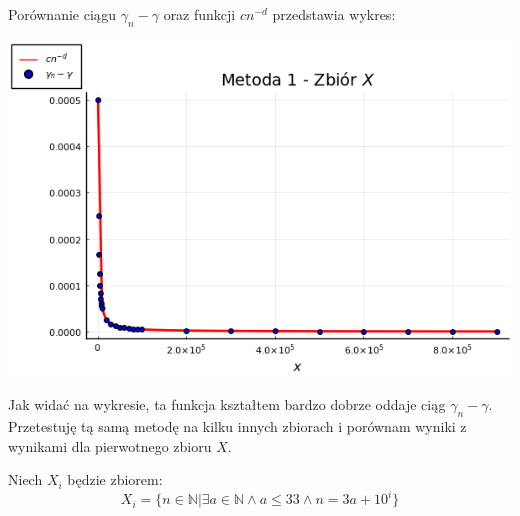 \documentclass[11pt,wide]{mwart}
\begin{document}
\begin{samepage}
Porównanie ciągu $\gamma_n - \gamma$ oraz funkcji $cn^{-d}$ przedstawia wykres:

\vspace{1cm}
\centerline{\includegraphics[scale=0.8]{chart1_1}}
\vspace{1cm}

\end{samepage}

Jak widać na wykresie, ta funkcja kształtem bardzo dobrze oddaje ciąg $\gamma_n - \gamma$. 
Przetestuję tą samą metodę na kilku innych zbiorach i porównam wyniki z wynikami dla pierwotnego zbioru $X$.

\begin{samepage}
Niech $X_i$ będzie zbiorem:
\begin{equation}
X_i = \{n \in \mathbb{N} | \exists a \in \mathbb{N} \wedge a \le 33 \wedge n = 3a + 10^i\}
\end{equation}
\end{samepage}
\end{document}
